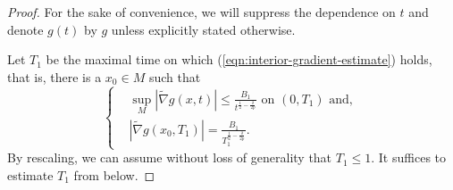 \documentclass[12pt]{amsart}
\theoremstyle{plain}
\theoremstyle{plain}
\theoremstyle{definition}
\theoremstyle{remark}
\numberwithin{equation}{subsection}
\newcommand{\hdel}{\tilde{\nabla}}
\begin{document}
\begin{proof}
    For the sake of convenience, we will suppress the dependence on $t$ and denote $g(t)$ by $g$ unless explicitly stated otherwise.
    
    Let $T_1$ be the maximal time on which (\ref{eqn:interior-gradient-estimate}) holds, that is, there is a $x_0 \in M$ such that
    \begin{equation}\label{eqn:gradient-estimate-maximal-T1}
        \begin{cases}
            &\sup\limits_M |\hdel g(x,t)| \leq \frac{B_1}{t^{\frac{1}{2}-\frac{\delta}{2p}}} \text{ on } (0,T_1) \text{ and, } \\
            &|\hdel g(x_0, T_1)| = \frac{B_1}{T_1^{\frac{1}{2}-\frac{\delta}{2p}}}.
        \end{cases}
    \end{equation}
    By rescaling, we can assume without loss of generality that $T_1 \leq 1$. It suffices to estimate $T_1$ from below. 
    

\end{proof}
\end{document}
